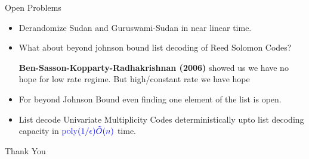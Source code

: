 \documentclass[10pt,handout]{beamer}
\DeclareMathOperator{\poly}{poly}
\begin{document}
\begin{frame}{Open Problems}
	\begin{itemize}
		\item Derandomize Sudan and Guruswami-Sudan in near linear time. \pause
		\item What about beyond johnson bound list decoding of Reed Solomon Codes? \pause

		      \textbf{Ben-Sasson-Kopparty-Radhakrishnan (2006)} showed us we have no hope for low rate regime. But high/constant rate we have hope\pause
		\item For beyond Johnson Bound even finding one element of the list is open. \pause
		\item List decode Univariate Multiplicity Codes deterministically upto list decoding capacity in $\textcolor{blue}{\mathcolor{blue}{\poly(1/\epsilon)\tilde{O}(n)}}$ time.
	\end{itemize}
\end{frame}
\begin{frame}[standout]
	Thank You
\end{frame}
\end{document}
